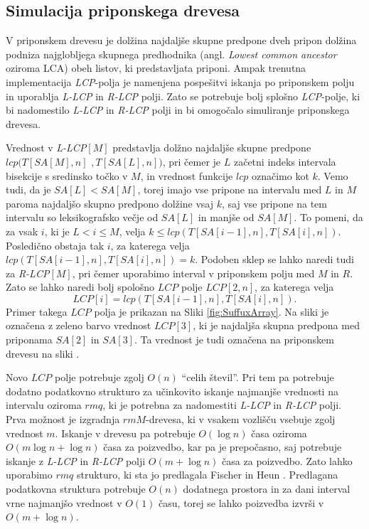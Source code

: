 \subsection{Simulacija priponskega drevesa}\label{sec:STsimulacija}
V priponskem drevesu je dolžina najdaljše skupne predpone dveh pripon dolžina podniza najglobljega skupnega predhodnika (angl. \textit{Lowest common ancestor} oziroma LCA) obeh listov, ki predstavljata priponi. Ampak trenutna implementacija \textit{LCP}-polja je namenjena pospešitvi iskanja po priponskem polju in uporablja \textit{L-LCP} in \textit{R-LCP} polji. Zato se potrebuje bolj splošno \textit{LCP}-polje, ki bi nadomestilo \textit{L-LCP} in \textit{R-LCP} polji in bi omogočalo simuliranje priponskega drevesa.

Vrednost v \textit{L-LCP}$[M]$ predstavlja dolžno najdaljše skupne predpone $lcp(T[SA[M], n]$ $,T[SA[L], n])$, pri čemer je $L$ začetni indeks intervala bisekcije s sredinsko točko v $M$, in vrednost funkcije $lcp$ označimo kot $k$. Vemo tudi, da je $SA[L]<SA[M]$, torej imajo vse pripone na intervalu med $L$ in $M$ paroma najdaljšo skupno predpono dolžine vsaj $k$, saj vse pripone na tem intervalu so leksikografsko večje od $SA[L]$ in manjše od $SA[M]$. To pomeni, da za vsak $i$, ki je $L<i\le M$, velja $k\le lcp(T[SA[i-1], n], T[SA[i], n])$. Posledično obstaja tak $i$, za katerega velja $lcp(T[SA[i-1], n], T[SA[i], n])=k$. Podoben sklep se lahko naredi tudi za \textit{R-LCP}$[M]$, pri čemer uporabimo interval v priponskem polju med $M$ in $R$. Zato se lahko naredi bolj spološno $LCP$ polje $LCP[2,n]$, za katerega velja
$$
    LCP[i]=lcp(T[SA[i-1], n], T[SA[i], n]).
$$
Primer takega $LCP$ polja je prikazan na Sliki \ref{fig:SuffuxArray}. Na sliki je označena z zeleno barvo vrednost $LCP[3]$, ki je najdaljša skupna predpona med priponama $SA[2]$ in $SA[3]$. Ta vrednost je tudi označena na priponskem drevesu na sliki \cite{Abouelhoda2004, Kasai2001}.

Novo $LCP$ polje potrebuje zgolj $O(n)$ \enquote{celih števil}. Pri tem pa potrebuje dodatno podatkovno strukturo za učinkovito iskanje najmanjše vrednosti na intervalu oziroma $rmq$, ki je potrebna za nadomestiti \textit{L-LCP} in \textit{R-LCP} polji. Prva možnost je izgradnja $rmM$-drevesa, ki v vsakem vozlišču vsebuje zgolj vrednost $m$. Iskanje v drevesu pa potrebuje $O(\log{n})$ časa oziroma $O(m\log{n}+\log{n})$ časa za poizvedbo, kar pa je prepočasno, saj potrebuje iskanje z \textit{L-LCP} in \textit{R-LCP} polji $O(m+\log{n})$ časa za poizvedbo. Zato lahko uporabimo $rmq$ strukturo, ki sta jo predlagala Fischer in Heun \cite{Fischer2007}. Predlagana podatkovna struktura potrebuje $O(n)$ dodatnega prostora in za dani interval vrne najmanjšo vrednost v $O(1)$ času, torej se lahko poizvedba izvrši v $O(m+\log{n})$.

